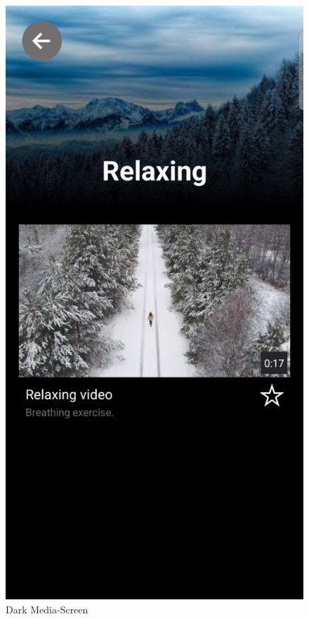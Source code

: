 \begin{figure}[H]
    \begin{minipage}{0.5\textwidth}
        \centering
        \includegraphics[height=1.9\textwidth]{./pics/dMedia.jpg}
        \caption{Dark Media-Screen}
    \end{minipage}
    \begin{minipage}{0.5\textwidth}

\end{minipage}
\end{figure}
